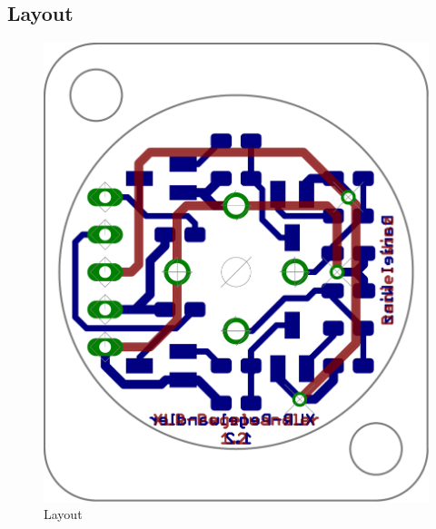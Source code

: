 \subsection{Layout}
\begin{figure}[h!]
	\centering
	\includegraphics[scale=\layscale]{fig/xlr_pegelwandler_v_1_2_lay_transp.pdf}
	\caption{Layout}
	\label{lay:pegw}
\end{figure}
